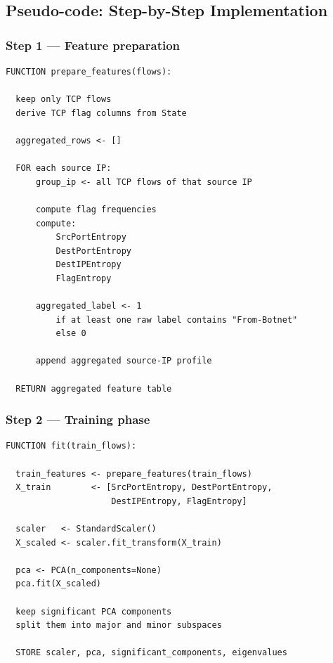 \documentclass{article}
\begin{document}
\subsection{Pseudo-code: Step-by-Step Implementation}

\subsubsection*{Step 1 --- Feature preparation}

\begin{lstlisting}[caption={Feature preparation in the current implementation}]
FUNCTION prepare_features(flows):

  keep only TCP flows
  derive TCP flag columns from State

  aggregated_rows <- []

  FOR each source IP:
      group_ip <- all TCP flows of that source IP

      compute flag frequencies
      compute:
          SrcPortEntropy
          DestPortEntropy
          DestIPEntropy
          FlagEntropy

      aggregated_label <- 1
          if at least one raw label contains "From-Botnet"
          else 0

      append aggregated source-IP profile

  RETURN aggregated feature table
\end{lstlisting}

\subsubsection*{Step 2 --- Training phase}

\begin{lstlisting}[caption={PCA fitting in the current implementation}]
FUNCTION fit(train_flows):

  train_features <- prepare_features(train_flows)
  X_train        <- [SrcPortEntropy, DestPortEntropy,
                     DestIPEntropy, FlagEntropy]

  scaler   <- StandardScaler()
  X_scaled <- scaler.fit_transform(X_train)

  pca <- PCA(n_components=None)
  pca.fit(X_scaled)

  keep significant PCA components
  split them into major and minor subspaces

  STORE scaler, pca, significant_components, eigenvalues
\end{lstlisting}
\end{document}
